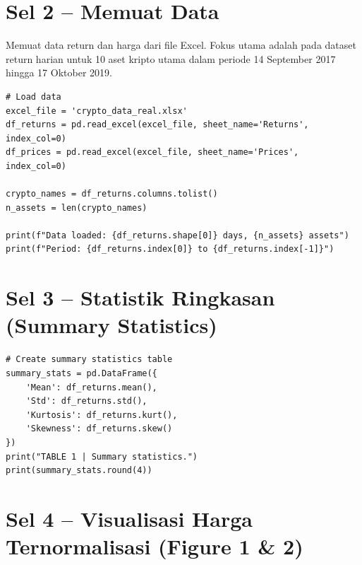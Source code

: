\documentclass[12pt,a4paper]{article}
\begin{document}
\section{Sel 2 -- Memuat Data}
Memuat data return dan harga dari file Excel. Fokus utama adalah pada dataset return harian untuk 10 aset kripto utama dalam periode 14 September 2017 hingga 17 Oktober 2019.

\begin{lstlisting}[caption={Load dataset kripto}]
# Load data
excel_file = 'crypto_data_real.xlsx'
df_returns = pd.read_excel(excel_file, sheet_name='Returns', index_col=0)
df_prices = pd.read_excel(excel_file, sheet_name='Prices', index_col=0)

crypto_names = df_returns.columns.tolist()
n_assets = len(crypto_names)

print(f"Data loaded: {df_returns.shape[0]} days, {n_assets} assets")
print(f"Period: {df_returns.index[0]} to {df_returns.index[-1]}")
\end{lstlisting}

\section{Sel 3 -- Statistik Ringkasan (Summary Statistics)}

\begin{lstlisting}[caption={Kalkulasi statistik deskriptif aset}]
# Create summary statistics table
summary_stats = pd.DataFrame({
    'Mean': df_returns.mean(),
    'Std': df_returns.std(),
    'Kurtosis': df_returns.kurt(),
    'Skewness': df_returns.skew()
})
print("TABLE 1 | Summary statistics.")
print(summary_stats.round(4))
\end{lstlisting}

\section{Sel 4 -- Visualisasi Harga Ternormalisasi (Figure 1 \& 2)}
\end{document}
